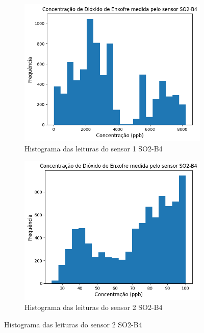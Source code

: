 \begin{figure}[h]
    \centering
    \caption{Histogramas das leituras dos sensores SO2-B4}
    \begin{subfigure}{0.495\textwidth}
        \includegraphics[width=\textwidth]{aftertext/Leituras SO2/preproc-hist-so2-b4-1.png}
        \caption{Histograma das leituras do sensor 1 SO2-B4}
        \label{fig:data-so2-1-preproc-hist}
    \end{subfigure}
    \hfill
    \begin{subfigure}{0.495\textwidth}
        \includegraphics[width=\textwidth]{aftertext/Leituras SO2/preproc-hist-so2-b4-2.png}
        \caption{Histograma das leituras do sensor 2 SO2-B4}
        \label{fig:data-so2-2-preproc-hist}
    \end{subfigure}
\end{figure}